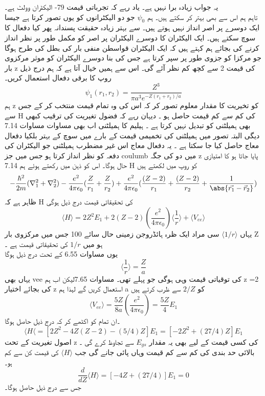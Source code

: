 یہ جواب زیادہ برا نہیں ہے۔
یاد رہے کہ تجرباتی قیمت 79- الیکٹران وولٹ ہے۔\\
تاہم ہم اس سے بھی بہتر کر سکتے ہیں۔
ہم
\(\psi_{0}\)
جو دو الیکٹرانوں کو یوں تصور کرتا ہے جیسا ایک دوسرے پر اصر انداز نہیں ہوتے ہیں۔
سے بہتر زیادہ حقیقت پسندانہ پھر کیا دفعال کا سوچ سکتے ہیں۔
ایک الیکٹران کا دوسرے الیکٹران پر اصر کو مکمل طور پر نظر انداز کرنے کی بجائے ہم کہتے ہیں کہ ایک الیکٹران قواسطن منفی بار کی بطل کی طرح ہوگا جو مرکزا کو جزوی طور پر سپر کرتا ہے جس کی بنا دوسرے الیکٹران کو موثر مرکزوی بار z کی قیمت 2 سے کچھ کم نظر آئے گی۔ اس سے ہمیں خیال آتا ہے کہ ہم درج ذیل روپ کا برقی دفعال استعمال کریں۔
\[\psi_{1}(r_{1},r_{2})=\frac{Z^{3}}{\pi a^{3}e^{-Z(r_{1}+r_{2})/a}}\]
ہم z کو تخیریت کا مقدار معلوم تصور کر کہ اس کی وہ تمام قیمت منتخب کر کے جس سے H کی کم سے کم قیمت حاصل ہو ۔
دیہان رہے کہ فضول تغیریت کی ترقیب کبھی بھی ہمیلٹنی کو تبدیل نہیں کرتا ہے ۔
ہیلیم کا ہمیلٹنی اب بھی مساوات 
مساوات 7.14
دیگی البتہ
تصور میں ہمیلٹنی کی تخمیمی قیمت کے بارے میں سوچ کے بہتر بلکیا دفعال معاج حاصل کیا جا سکتا ہے ۔
یہ دفعال معاج اس غیر مضطرب ہمیلٹنی جو الیکٹران کی دفعہ کو نظر انداز کرتا ہو جس میں جز coulumb میں دو کی جگہ z پایا جاتا ہو کا امتیازی حال ہوگا۔
اس کو ذہن میں رکھتے ہوئے ہم 7.14 H کو روپ میں لکھتے ہیں 
\[-\frac{\hbar^{2}}{2m}(\nabla_{1}^{2}+\nabla_{2}^{2})-\frac{e^{2}}{4\pi\epsilon_{0}}(\frac{Z}{r_{1}}+\frac{Z}{r_{2}})+\frac{e^{2}}{4\pi\epsilon_{0}}(\frac{(Z-2)}{r_{1}}+\frac{(Z-2)}{r_{2}}+\frac{1}{\abs{\vec{r_{1}}-\vec{r}_{2}}})\]
ظاہر ہے کہ H کی تحقیقاتی قیمت درج ذیل ہوگی 
\[\langle H \rangle = 2Z^{2}E_{1}+2(Z-2)(\frac{e^{2}}{4\pi\epsilon_{0}})\langle \frac{1}{r}\rangle + \langle V_{ee} \rangle \]
یہاں
\(\langle 1/r \rangle \) 
سی مراد ایک ظرہ ہائڈروجن زمینی حال سائے 100 جس میں مرکزوی بار 
Z
 ہو میں
\(1/r\)
کی تحقیقاتی قیمت ہے ۔\\
یوں مساوات 6.55 کے تحت درج ذیل ہوگا 
\[\langle \frac{1}{r} \rangle = \frac{Z}{a}\]
یہاں بھی vee کی توقیاتی قیمت وہی ہوگی جو پہلے تھی۔
مساوات 7.65لیکن اب ہم z =2 کی بجائے اختیار z استعمال کریں گے لہذا ہم a کو 
\(2/Z\)
 سے ظرب کرتے ہیں 
 \[\langle V_{ee} \rangle =\frac{5Z}{8a}(\frac{e^{2}}{4\pi\epsilon_{0}})=\frac{5Z}{4}E_{1}\]
 ۔ان تمام کو اکٹھے کر کہ درج ذیل حاصل ہوگا 
 \[\langle H \langle =[2Z^{2}-4Z(Z-2)-(5/4)Z]E_{1}=[-2Z^{2}+(27/4)Z]E_{1}\]
اصول تغیریت کے تحت z کی کسی قیمت کے لیے بھی یہ مقدار 
\(E_{gs}\)
سے تجاوظ کرے گی ۔\\
بالائی حد بندی کی کم سے کم قیمت وہاں پائی جانے گی جب
 \(\langle H \rangle  \)
  کی قیمت کن سے کم ہو۔\\
\[\frac{d}{dZ}\langle H \rangle =[-4Z+(27/4)]E_{1}=0\]
جس سے درج ذیل حاصل ہوگا۔
